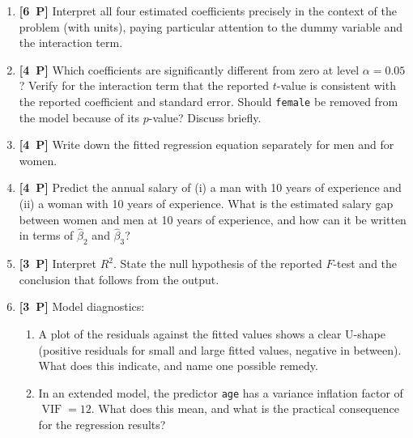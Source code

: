 \documentclass[11pt,a4paper]{article}
\newcommand{\pp}[1]{\textbf{[#1~P]}\enspace}
\begin{document}
\begin{enumerate}[label=(\alph*),leftmargin=7mm,itemsep=2.5mm]
  \item \pp{6} Interpret all four estimated coefficients precisely in the context of the
    problem (with units), paying particular attention to the dummy variable and the
    interaction term.
  \item \pp{4} Which coefficients are significantly different from zero at level
    $\alpha=0.05$? Verify for the interaction term that the reported $t$-value is consistent
    with the reported coefficient and standard error. Should \texttt{female} be removed from
    the model because of its $p$-value? Discuss briefly.
  \item \pp{4} Write down the fitted regression equation separately for men and for women.
  \item \pp{4} Predict the annual salary of (i) a man with 10 years of experience and (ii) a
    woman with 10 years of experience. What is the estimated salary gap between women and men
    at 10 years of experience, and how can it be written in terms of $\hat{\beta}_2$ and
    $\hat{\beta}_3$?
  \item \pp{3} Interpret $R^2$. State the null hypothesis of the reported $F$-test and the
    conclusion that follows from the output.
  \item \pp{3} Model diagnostics:
    \begin{enumerate}[label=(\roman*),nosep,topsep=1mm]
      \item A plot of the residuals against the fitted values shows a clear U-shape
        (positive residuals for small and large fitted values, negative in between).
        What does this indicate, and name one possible remedy.
      \item In an extended model, the predictor \texttt{age} has a variance inflation factor
        of $\operatorname{VIF}=12$. What does this mean, and what is the practical consequence
        for the regression results?
    \end{enumerate}
\end{enumerate}
\end{document}
